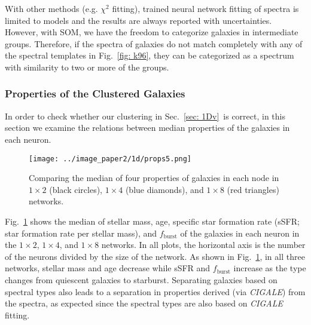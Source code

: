             With other methods (e.g. $\chi^2$ fitting), trained neural network fitting of spectra is limited to models and the results are always reported with uncertainties.
            However, with SOM, we have the freedom to categorize galaxies in intermediate groups.
            Therefore, if the spectra of galaxies do not match completely with any of the spectral templates in Fig.~\ref{fig: k96}, they can be categorized as a spectrum with similarity to two or more of the groups.

                        
        
        
        \subsubsection{Properties of the Clustered Galaxies}
        
       In order to check whether our clustering in Sec.~\ref{sec: 1Dv}~is correct, in this section we examine the relations between median properties of the galaxies in each neuron. 
        
        \begin{figure}
            \centering
            \texttt{[image: ../image\_paper2/1d/props5.png]}
            \caption[The median of four properties of galaxies in three networks]{Comparing the median of four properties of galaxies in each node in $1\times2$ (black circles), $1\times4$ (blue diamonds), and $1\times8$ (red triangles) networks.}
            \label{fig: props}
        \end{figure}
       
        Fig.~\ref{fig: props} shows the median of stellar mass, age, specific star formation rate (sSFR; star formation rate per stellar mass), and $f_\mathrm{burst}$ of the galaxies in each neuron in the $1\times2$, $1\times4$, and $1\times8$ networks.
        In all plots, the horizontal axis is the number of the neurons divided by the size of the network.%
%        
        As shown in Fig.~\ref{fig: props}, in all three networks, stellar mass and age decrease while sSFR and $f_\mathrm{burst}$ increase as the type changes from quiescent galaxies to starburst. 
       Separating galaxies based on spectral types also leads to a separation in properties derived (via {\em CIGALE}) from the spectra, as expected since the spectral types are also based on {\em CIGALE} fitting. 
    

